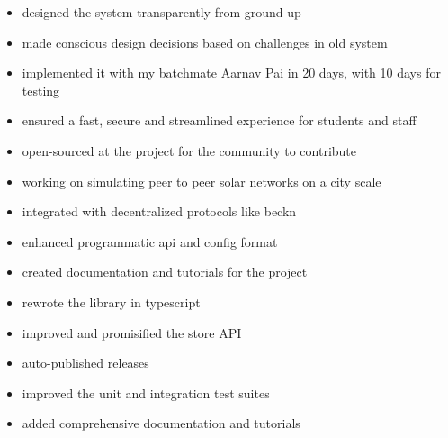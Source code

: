 \documentclass{resume}
\begin{document}
\begin{adjustwidth}{2em}{0em}

\begin{itemize}
    \item designed the system transparently from ground-up
    \item made conscious design decisions based on challenges in old system
    \item implemented it with my batchmate Aarnav Pai in 20 days, with 10 days for testing
    \item ensured a fast, secure and streamlined experience for students and staff
    \item open-sourced at the project for the community to contribute
\end{itemize}
\vspace{0.5em}

\begin{itemize}
    \item working on simulating peer to peer solar networks on a city scale
    \item integrated with decentralized protocols like beckn
    \item enhanced programmatic api and config format
    \item created documentation and tutorials for the project
\end{itemize}
\vspace{0.5em}

\begin{itemize}
    \item rewrote the library in typescript
    \item improved and promisified the store API
    \item auto-published releases
    \item improved the unit and integration test suites
    \item added comprehensive documentation and tutorials
\end{itemize}
\vspace{0.5em}

\end{adjustwidth}
\end{document}
